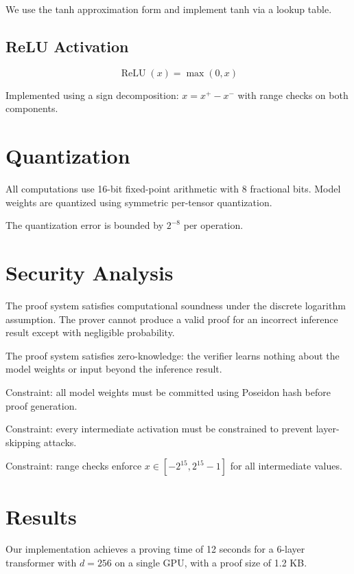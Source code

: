 \documentclass{article}
\begin{document}
We use the tanh approximation form and implement tanh via a lookup table.

\subsection{ReLU Activation}

\begin{equation}
    \operatorname{ReLU}(x) = \max(0, x)
\end{equation}

Implemented using a sign decomposition: $x = x^+ - x^-$ with range checks on both components.

\section{Quantization}

All computations use 16-bit fixed-point arithmetic with 8 fractional bits. Model weights
are quantized using symmetric per-tensor quantization.

The quantization error is bounded by $2^{-8}$ per operation.

\section{Security Analysis}

\begin{theorem}
The proof system satisfies computational soundness under the discrete logarithm assumption.
The prover cannot produce a valid proof for an incorrect inference result except with
negligible probability.
\end{theorem}

\begin{theorem}
The proof system satisfies zero-knowledge: the verifier learns nothing about the model
weights or input beyond the inference result.
\end{theorem}

Constraint: all model weights must be committed using Poseidon hash before proof generation.

Constraint: every intermediate activation must be constrained to prevent layer-skipping attacks.

Constraint: range checks enforce $x \in [-2^{15}, 2^{15}-1]$ for all intermediate values.

\section{Results}

Our implementation achieves a proving time of 12 seconds for a 6-layer transformer
with $d=256$ on a single GPU, with a proof size of 1.2 KB.
\end{document}
